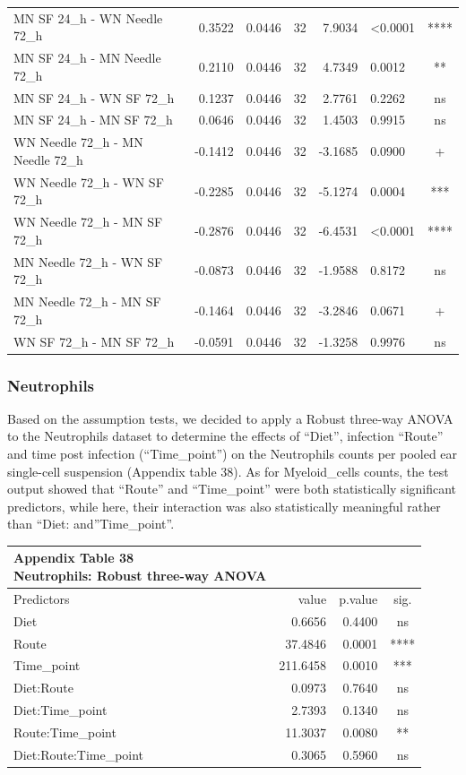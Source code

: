 \documentclass[
  12pt,
  letterpaper,
]{article}
\begin{document}
\begin{longtable}{l|rrrrlc}
MN SF 24\_h - WN Needle 72\_h & 0.3522 & 0.0446 & 32 & 7.9034 & <0.0001 & **** \\ 
MN SF 24\_h - MN Needle 72\_h & 0.2110 & 0.0446 & 32 & 4.7349 & 0.0012 & ** \\ 
MN SF 24\_h - WN SF 72\_h & 0.1237 & 0.0446 & 32 & 2.7761 & 0.2262 & ns \\ 
MN SF 24\_h - MN SF 72\_h & 0.0646 & 0.0446 & 32 & 1.4503 & 0.9915 & ns \\ 
WN Needle 72\_h - MN Needle 72\_h & -0.1412 & 0.0446 & 32 & -3.1685 & 0.0900 & + \\ 
WN Needle 72\_h - WN SF 72\_h & -0.2285 & 0.0446 & 32 & -5.1274 & 0.0004 & *** \\ 
WN Needle 72\_h - MN SF 72\_h & -0.2876 & 0.0446 & 32 & -6.4531 & <0.0001 & **** \\ 
MN Needle 72\_h - WN SF 72\_h & -0.0873 & 0.0446 & 32 & -1.9588 & 0.8172 & ns \\ 
MN Needle 72\_h - MN SF 72\_h & -0.1464 & 0.0446 & 32 & -3.2846 & 0.0671 & + \\ 
WN SF 72\_h - MN SF 72\_h & -0.0591 & 0.0446 & 32 & -1.3258 & 0.9976 & ns \\ 
\bottomrule
\end{longtable}
\endgroup

\subsubsection{Neutrophils}\label{neutrophils-3}

Based on the assumption tests, we decided to apply a Robust three-way ANOVA to the Neutrophils dataset to determine the effects of ``Diet'', infection ``Route'' and time post infection (``Time\_point'') on the Neutrophils counts per pooled ear single-cell suspension (Appendix table 38). As for Myeloid\_cells counts, the test output showed that ``Route'' and ``Time\_point'' were both statistically significant predictors, while here, their interaction was also statistically meaningful rather than ``Diet: and''Time\_point''.

\begingroup
\fontsize{12.0pt}{14.4pt}\selectfont
\begin{longtable}{l|rrc}
\caption*{
{\large \textbf{Appendix Table 38}} \\ 
{\small \textbf{Neutrophils: Robust three-way ANOVA}}
} \\ 
\toprule
Predictors & {value} & {p.value} & {sig.} \\ 
\midrule\addlinespace[2.5pt]
Diet & 0.6656 & 0.4400 & ns \\ 
Route & 37.4846 & 0.0001 & **** \\ 
Time\_point & 211.6458 & 0.0010 & *** \\ 
Diet:Route & 0.0973 & 0.7640 & ns \\ 
Diet:Time\_point & 2.7393 & 0.1340 & ns \\ 
Route:Time\_point & 11.3037 & 0.0080 & ** \\ 
Diet:Route:Time\_point & 0.3065 & 0.5960 & ns \\ 
\bottomrule
\end{longtable}
\endgroup
\end{document}
